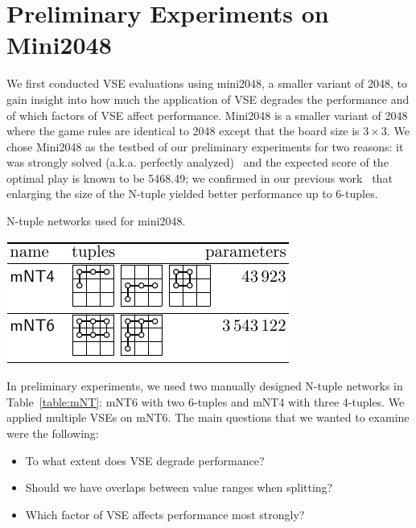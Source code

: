 \section{Preliminary Experiments on Mini2048}


We first conducted VSE evaluations using mini2048, a smaller variant of 2048, to gain insight into how much the application of VSE degrades the performance and of which factors of VSE affect performance.
Mini2048 is a smaller variant of 2048 where the game rules are identical to 2048 except that the board size is $3\times 3$.
We chose Mini2048 as the testbed of our preliminary experiments for two reasons: it was strongly solved (a.k.a. perfectly analyzed)~\cite{YaKN22,TeKM23} and the expected score of the optimal play is known to be 5468.49; we confirmed in our previous work~\cite{TeMa25} that enlarging the size of the N-tuple yielded better performance up to 6-tuples.


\begin{table}
 \caption{N-tuple networks used for mini2048.}
 \label{table:mNT}
 \centering\includegraphics[]{figures/mNT-table.pdf}
\end{table}

In preliminary experiments, we used two manually designed N-tuple networks in Table~\ref{table:mNT}: \textsf{mNT6} with two 6-tuples and \textsf{mNT4} with three 4-tuples. We applied multiple VSEs on \textsf{mNT6}.
The main questions that we wanted to examine were the following:
\begin{itemize}
 \item To what extent does VSE degrade performance?
 \item Should we have overlaps between value ranges when splitting?
 \item Which factor of VSE affects performance most strongly?
\end{itemize}


